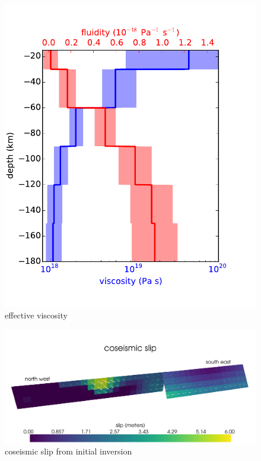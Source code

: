 \documentclass[12pt]{article}
\begin{document}
\begin{figure}
\includegraphics[scale=1.0]{Figures/effective_viscosity}
\centering 
\caption{effective viscosity}
\label{fig:EffectiveViscosity}
\end{figure} 

\begin{figure}
\includegraphics[scale=0.1]{Figures/initial_coseismic}
\caption{coseismic slip from initial inversion}
\label{fig:InitialCoseismic}
\end{figure} 
\end{document}
